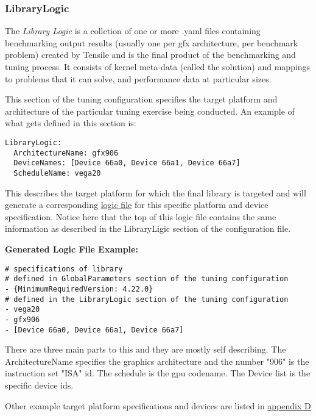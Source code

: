 \documentclass[]{article}
\begin{document}
\label{sec:LibraryLogic}
\subsubsection{LibraryLogic}

The \emph{Library Logic} is a collction of one or more .yaml files containing benchmarking output results (usually one per gfx architecture, per benchmark problem) created by Tensile and is the final product of the benchmarking and tuning process. It consists of kernel meta-data (called the solution) and mappings to problems that it can solve, and performance data at particular sizes.

This section of the tuning configuration specifies the target platform and architecture of the particular tuning exercise being conducted. An example of what gets defined in this section is:

\begin{verbatim}
LibraryLogic:
  ArchitectureName: gfx906
  DeviceNames: [Device 66a0, Device 66a1, Device 66a7]
  ScheduleName: vega20
\end{verbatim}

This describes the target platform for which the final library is targeted and will generate a corresponding \hyperref[sec:logicFile]{logic file} for this specific platform and device specification. Notice here that the top of this logic file contains the same information as described in the LibraryLigic section of the configuration file. \newline

\noindent \textbf{Generated Logic File Example:}
\begin{verbatim}
# specifications of library
# defined in GlobalParameters section of the tuning configuration
- {MinimumRequiredVersion: 4.22.0}
# defined in the LibraryLogic section of the tuning configuration
- vega20
- gfx906
- [Device 66a0, Device 66a1, Device 66a7]
\end{verbatim}

There are three main parts to this and they are mostly self describing. The ArchitectureName specifies the graphics architecture and the number "906" is the instruction set "ISA" id. The schedule is the gpu codename. The Device list is the specific device ids. 

Other example target platform specifications and devices are listed in \hyperref[sec:appendixD]{appendix D}
\end{document}
